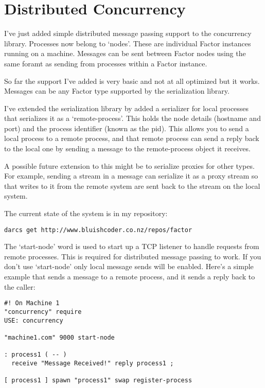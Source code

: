 \chapter{Distributed Concurrency}\label{distributedconcurrency}

I've just added simple distributed message passing support to the
concurrency library. Processes now belong to `nodes'. These are
individual Factor instances running on a machine. Messages can be sent
between Factor nodes using the same foramt as sending from processes
within a Factor instance.

So far the support I've added is very basic and not at all optimized
but it works. Messages can be any Factor type supported by the
serialization library.

I've extended the serialization library by added a serializer for
local processes that serializes it as a `remote-process'. This holds
the node details (hostname and port) and the process identifier (known
as the pid). This allows you to send a local process to a remote
process, and that remote process can send a reply back to the local
one by sending a message to the remote-process object it receives.

A possible future extension to this might be to serialize proxies for
other types. For example, sending a stream in a message can serialize
it as a proxy stream so that writes to it from the remote system are
sent back to the stream on the local system.

The current state of the system is in my repository:

\begin{verbatim}
darcs get http://www.bluishcoder.co.nz/repos/factor
\end{verbatim}


The `start-node' word is used to start up a TCP listener to handle
requests from remote processes. This is required for distributed
message passing to work. If you don't use `start-node' only local
message sends will be enabled. Here's a simple example that sends a
message to a remote process, and it sends a reply back to the caller:

\begin{verbatim}
#! On Machine 1
"concurrency" require
USE: concurrency

"machine1.com" 9000 start-node

: process1 ( -- )
  receive "Message Received!" reply process1 ;

[ process1 ] spawn "process1" swap register-process
\end{verbatim}


